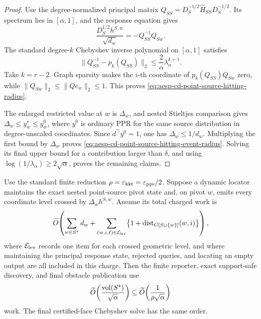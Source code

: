 \begin{proof}
Use the degree-normalized principal matrix
\(Q_{SS}=D_S^{-1/2}\widehat H_{SS}D_S^{-1/2}\).  Its spectrum lies in
\([\alpha,1]\), and the response equation gives
\begin{equation*}
 \frac{D_S^{1/2}h^{S,w}}{\sqrt{d_w}}
 =-Q_{SS}^{-1}Q_{Sw}.
\end{equation*}
The standard degree-\(k\) Chebyshev inverse polynomial on
\([\alpha,1]\) satisfies
\begin{equation*}
 \|Q_{SS}^{-1}-p_k(Q_{SS})\|_2
 \leq\frac2\alpha\lambda_\alpha^{k+1}.
\end{equation*}
Take \(k=r-2\).  Graph sparsity makes the \(i\)-th coordinate of
\(p_k(Q_{SS})Q_{Sw}\) zero, while
\(\|Q_{Sw}\|_2\leq\|Qe_w\|_2\leq1\).  This proves
\cref{eq:aesp-cd-point-source-hitting-radius}.

The enlarged restricted value at \(w\) is \(\Delta_w\), and nested
Stieltjes comparison gives
\(\Delta_w\leq y_w^\star\leq y_w^0\), where \(y^0\) is ordinary PPR for
the same source distribution in degree-unscaled coordinates.  Since
\(d^\top y^0=1\), one has \(\Delta_w\leq1/d_w\).  Multiplying the first
bound by \(\Delta_w\) proves
\cref{eq:aesp-cd-point-source-hitting-event-radius}.  Solving its final
upper bound for a contribution larger than \(\delta\), and using
\(\log(1/\lambda_\alpha)\geq2\sqrt\alpha\), proves the remaining claims.
\end{proof}

\begin{corollary}
\label{cor:aesp-cd-point-source-route-output-interface}
Use the standard finite reduction
\(\rho=\varepsilon_{\mathrm{kkt}}=\varepsilon_{\mathrm{ppr}}/2\).  Suppose a dynamic locator maintains the exact
nested point-source pivot state and, on pivot \(w\), emits every coordinate
level crossed by \(\Delta_w h^{S,w}\).  Assume its total charged work is
\begin{equation}
\widetilde O\!\left(
  \sum_{w\in S^\star}d_w
  +
  \sum_{(w,i,\ell)\in\mathcal E_{\rm lev}}
   \bigl\{1+\operatorname{dist}_{G[S\cup\{w\}]}(w,i)\bigr\}
 \right),
 \label{eq:aesp-cd-point-source-route-output-interface}
\end{equation}
where \(\mathcal E_{\rm lev}\) records one item for each crossed geometric
level, and where maintaining the principal response state, rejected queries,
and locating an empty output are all included in this charge.  Then the
finite reporter, exact support-safe discovery, and final obstacle
publication use
\begin{equation*}
 \widetilde O\!\left(
  \frac{\operatorname{vol}(S^\star)}{\sqrt\alpha}\right)
 \subseteq
 \widetilde O\!\left(
  \frac1{\rho\sqrt\alpha}\right)
\end{equation*}
work.  The final certified-face Chebyshev solve has the same order.
\end{corollary}

